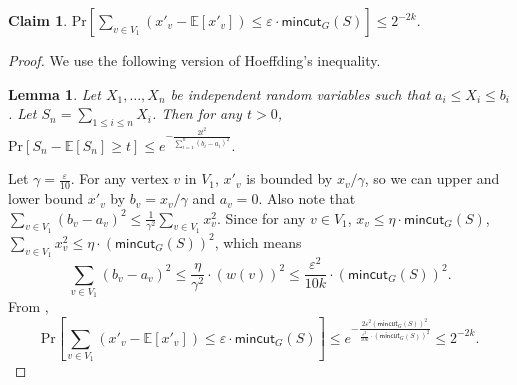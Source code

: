 \documentclass[11pt]{article}
\newtheorem{lemma}[theorem]{Lemma}
\theoremstyle{definition}
\newtheorem{claim}[theorem]{Claim}
\newcommand{\eps}{{\varepsilon}}
\def\pr#1{\mathrm{Pr}\left[ #1 \right]}
\def\ex#1{{\mathbb{E}}\left[ #1 \right]}
\newcounter{note}
\newcommand{\mc}{\mathsf{mincut}}
\begin{document}
\begin{claim}
$\pr{\sum_{v \in V_1} (x'_v - \ex{x'_v}) \le \eps\cdot \mc_G(S)} \le 2^{-2k}$.
\end{claim}
\begin{proof}
We use the following version of Hoeffding's inequality.
\begin{lemma} \label{hoeffding}
	Let $X_1,\dots,X_n$ be independent random variables such that $a_i \le X_i \le b_i$. Let $S_n = \sum_{1\le  i\le n}X_i$. Then for any $t>0$,
	$\pr{S_n - \ex{S_n} \ge t} \le e^{-\frac{2t^2}{\sum_{i=1}^n(b_i-a_i)^2}}.
	$
\end{lemma}

Let $\gamma = \frac{\eps}{10}$.
For any vertex $v$ in $V_1$, $x'_v$ is bounded by $x_v/\gamma$, so we can upper and lower bound $x'_v$ by $b_v = x_v/\gamma$ and $a_v=0$. Also note that 
$\sum_{v\in V_1} (b_v-a_v)^2 \le \frac{1}{\gamma^2} \sum_{v\in V_1} x^2_v.$
Since for any $v \in V_1$, $x_v \le \eta \cdot \mc_G(S)$, $\sum_{v\in V_1} x^2_v \le \eta \cdot(\mc_G(S))^2$, which means 
$$
\sum_{v\in V_1} (b_v-a_v)^2 \le \frac{\eta}{\gamma^2} \cdot (w(v))^2 \le \frac{\eps^2}{10k}\cdot (\mc_G(S))^2.
$$
From , 
$$
\pr{\sum_{v \in V_1} (x'_v - \ex{x'_v}) \le \eps\cdot \mc_G(S)} \le e^{-\frac{2\eps^2 (\mc_G(S))^2}{\frac{\eps^2}{10k}\cdot(\mc_G(S))^2}} \le 2^{-2k}.
$$
\end{proof}
\end{document}

